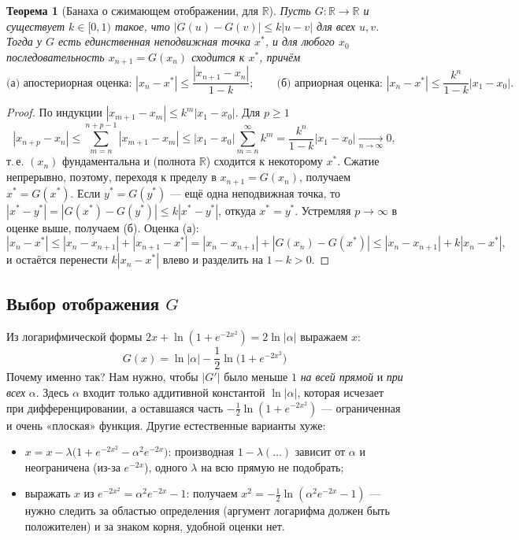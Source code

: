 \documentclass[11pt,a4paper]{article}
\newtheorem{theorem}{Теорема}
\begin{document}
\begin{theorem}[Банаха о сжимающем отображении, для $\mathbb R$]
Пусть $G\colon\mathbb R\to\mathbb R$ и существует $k\in[0,1)$ такое, что $|G(u)-G(v)|\le k|u-v|$ для всех $u,v$.
Тогда у $G$ есть единственная неподвижная точка $x^*$, и для любого $x_0$ последовательность $x_{n+1}=G(x_n)$ сходится к $x^*$, причём
\[
\text{(а) апостериорная оценка: } |x_n-x^*|\le\frac{|x_{n+1}-x_n|}{1-k};\qquad
\text{(б) априорная оценка: } |x_n-x^*|\le\frac{k^n}{1-k}|x_1-x_0|.
\]
\end{theorem}
\begin{proof}
По индукции $|x_{m+1}-x_m|\le k^m|x_1-x_0|$. Для $p\ge1$
\[
|x_{n+p}-x_n|\le\sum_{m=n}^{n+p-1}|x_{m+1}-x_m|\le|x_1-x_0|\sum_{m=n}^{\infty}k^m=\frac{k^n}{1-k}|x_1-x_0|\xrightarrow[n\to\infty]{}0,
\]
т.\,е. $(x_n)$ фундаментальна и (полнота $\mathbb R$) сходится к некоторому $x^*$. Сжатие непрерывно, поэтому, переходя к пределу в $x_{n+1}=G(x_n)$, получаем $x^*=G(x^*)$. Если $y^*=G(y^*)$ — ещё одна неподвижная точка, то $|x^*-y^*|=|G(x^*)-G(y^*)|\le k|x^*-y^*|$, откуда $x^*=y^*$.
Устремляя $p\to\infty$ в оценке выше, получаем (б). Оценка (а):
\[
|x_n-x^*|\le|x_n-x_{n+1}|+|x_{n+1}-x^*|=|x_n-x_{n+1}|+|G(x_n)-G(x^*)|\le|x_n-x_{n+1}|+k|x_n-x^*|,
\]
и остаётся перенести $k|x_n-x^*|$ влево и разделить на $1-k>0$.
\end{proof}

\subsection{Выбор отображения $G$}
Из логарифмической формы $2x+\ln(1+e^{-2x^2})=2\ln|\alpha|$ выражаем $x$:
\[
\boxed{\,G(x)=\ln|\alpha|-\frac12\ln\bigl(1+e^{-2x^2}\bigr)\,}
\]
Почему именно так? Нам нужно, чтобы $|G'|$ было меньше $1$ \emph{на всей прямой} и \emph{при всех} $\alpha$.
Здесь $\alpha$ входит только аддитивной константой $\ln|\alpha|$, которая исчезает при дифференцировании, а оставшаяся часть
$-\frac12\ln(1+e^{-2x^2})$ — ограниченная и очень «плоская» функция. Другие естественные варианты хуже:
\begin{itemize}
\item $x=x-\lambda\bigl(1+e^{-2x^2}-\alpha^2e^{-2x}\bigr)$: производная $1-\lambda(\dots)$ зависит от $\alpha$ и неограничена (из-за $e^{-2x}$), одного $\lambda$ на всю прямую не подобрать;
\item выражать $x$ из $e^{-2x^2}=\alpha^2e^{-2x}-1$: получаем $x^2=-\frac12\ln(\alpha^2e^{-2x}-1)$ — нужно следить за областью определения (аргумент логарифма должен быть положителен) и за знаком корня, удобной оценки нет.
\end{itemize}
\end{document}
